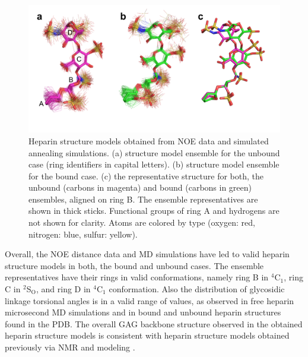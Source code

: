 \begin{figure}
\centering
\includegraphics[width=\textwidth]{gfx/nmr/Figure_07_bound_vs_free_three_panels_05.png}
\caption[]{
Heparin structure models obtained from NOE data and simulated annealing
simulations. (a) structure model ensemble for the unbound case (ring identifiers
in capital letters). (b) structure model ensemble for the bound case. (c) the
representative structure for both, the unbound (carbons in magenta) and bound
(carbons in green) ensembles, aligned on ring B. The ensemble representatives
are shown in thick sticks. Functional groups of ring A and hydrogens are not
shown for clarity. Atoms are colored by type (oxygen: red, nitrogen: blue,
sulfur: yellow).
}
\label{fig:nmr:hp_ensembles_representatives}
\end{figure}

Overall, the NOE distance data and MD simulations have led to valid heparin
structure models in both, the bound and unbound cases. The ensemble
representatives have their rings in valid conformations, namely ring B in
${}^4$C${}_1$, ring C in ${}^2$S${}_\mathrm{O}$, and ring D in ${}^4$C${}_1$
conformation. Also the distribution of glycosidic linkage torsional angles is in
a valid range of values, as observed in free heparin microsecond MD simulations
and in bound and unbound heparin structures found in the PDB. The overall GAG
backbone structure observed in the obtained heparin structure models is
consistent with heparin structure models obtained previously via NMR and
modeling \cite{foster_mulloy_1993}.

